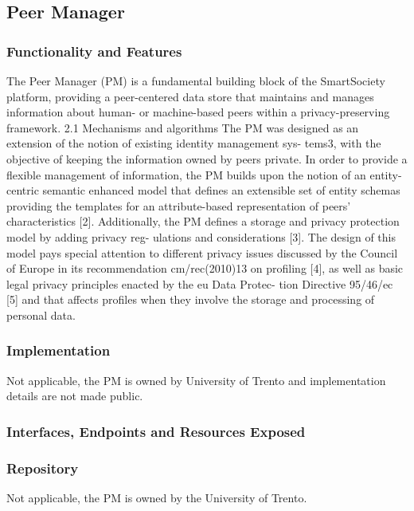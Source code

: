 \subsection{Peer Manager}
\subsubsection{Functionality and Features}
The Peer Manager (PM) is a fundamental building block of the SmartSociety platform, providing a peer-centered data store that maintains and manages information about human- or machine-based peers within a privacy-preserving framework.
2.1 Mechanisms and algorithms
The PM was designed as an extension of the notion of existing identity management sys- tems3, with the objective of keeping the information owned by peers private. In order to provide a flexible management of information, the PM builds upon the notion of an entity-centric semantic enhanced model that defines an extensible set of entity schemas providing the templates for an attribute-based representation of peers’ characteristics [2]. Additionally, the PM defines a storage and privacy protection model by adding privacy reg- ulations and considerations [3]. The design of this model pays special attention to different privacy issues discussed by the Council of Europe in its recommendation cm/rec(2010)13 on profiling [4], as well as basic legal privacy principles enacted by the eu Data Protec- tion Directive 95/46/ec [5] and that affects profiles when they involve the storage and processing of personal data.
\subsubsection{Implementation}
Not applicable, the PM is owned by University of Trento and implementation details are not made public.
\subsubsection{Interfaces, Endpoints and Resources Exposed}
\subsubsection{Repository}
Not applicable, the PM is owned by the University of Trento. 